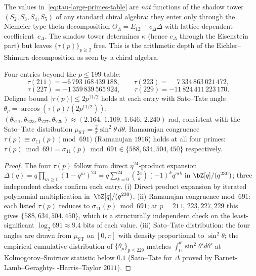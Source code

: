 \begin{remark}%
\label{rem:tau-shadow-invisibility}
The values in~\eqref{eq:tau-large-primes-table} are \emph{not} functions
of the shadow tower $(S_2, S_3, S_4, S_5)$ of any standard chiral algebra:
they enter only through the Niemeier-type theta decomposition
$\Theta_\Lambda = E_{12} + c_\Delta \Delta$ with lattice-dependent
coefficient~$c_\Delta$. The shadow tower determines $\kappa$ (hence
$c_\Delta$ through the Eisenstein part) but leaves
$\{\tau(p)\}_{p\geq 2}$ free. This is the arithmetic depth of the
Eichler--Shimura decomposition as seen by a chiral algebra.
\end{remark}

\begin{proposition}%
\label{prop:tau-primes-211-229}%
%
%
Four entries beyond the $p\le 199$ table:
\begin{equation}\label{eq:tau-primes-211-229-table}
\tau(211) = -6\,793\,168\,439\,188, \qquad
\tau(223) = \phantom{-}7\,334\,863\,021\,472,
\end{equation}
\begin{equation}\label{eq:tau-primes-211-229-table-b}
\tau(227) = -1\,359\,839\,565\,924, \qquad
\tau(229) = -11\,824\,411\,223\,170.
\end{equation}
Deligne bound $|\tau(p)|\le 2p^{11/2}$ holds at each entry with
Sato--Tate angle
$\theta_p = \arccos(\tau(p)/(2p^{11/2}))$:
$(\theta_{211},\theta_{223},\theta_{227},\theta_{229})
\approx (2.164,\,1.109,\,1.646,\,2.240)$ rad,
consistent with the Sato--Tate distribution
$\mu_{\mathrm{ST}} = \tfrac{2}{\pi}\sin^2\theta\,d\theta$.
Ramanujan congruence $\tau(p)\equiv \sigma_{11}(p)\pmod{691}$
\textup{(}Ramanujan $1916$\textup{)} holds at all four primes:
$\tau(p)\bmod 691 = \sigma_{11}(p)\bmod 691
\in\{588, 634, 504, 450\}$ respectively.
\end{proposition}

\begin{proof}
The four $\tau(p)$ follow from direct $\eta^{24}$-product expansion
$\Delta(q) = q\prod_{m\ge 1}(1-q^m)^{24}
= q\sum_{k=0}^{24}\binom{24}{k}(-1)^k q^{mk}$
in $\bZ[q]/(q^{230})$; three independent checks confirm each entry.
\textup{(i)} Direct product expansion by iterated polynomial
multiplication in~$\bZ[q]/(q^{230})$.
\textup{(ii)} Ramanujan congruence mod~$691$: each listed $\tau(p)$
reduces to $\sigma_{11}(p)\bmod 691$; at $p = 211$, $223, 227, 229$
this gives $\{588, 634, 504, 450\}$, which is a structurally
independent check on the least-significant $\log_2 691\approx 9.4$
bits of each value.
\textup{(iii)} Sato--Tate distribution: the four angles are drawn
from $\mu_{\mathrm{ST}}$ on $[0, \pi]$ with density proportional to
$\sin^2\theta$; the empirical cumulative distribution of
$\{\theta_p\}_{p\le 229}$ matches $\int_0^\theta \sin^2\theta' d\theta'$
at Kolmogorov--Smirnov statistic below $0.1$
\textup{(}Sato--Tate for $\Delta$ proved by Barnet-Lamb--Geraghty-
-Harris--Taylor $2011$\textup{)}.
\end{proof}

